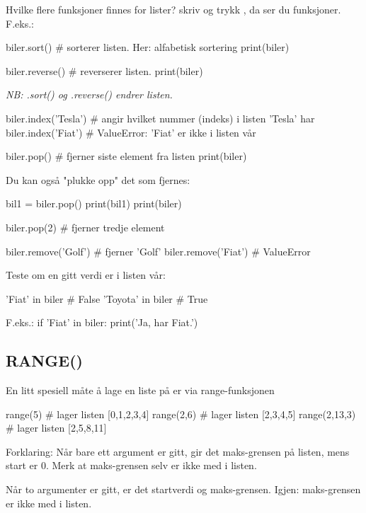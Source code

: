 {Hvilke flere funksjoner finnes for lister? skriv  og trykk , da ser du funksjoner. F.eks.:

\begin{usncodebox}
biler.sort()          # sorterer listen. Her: alfabetisk sortering
print(biler)

biler.reverse()       # reverserer listen. 
print(biler)
\end{usncodebox}

\emph{NB: .sort() og .reverse() endrer listen.}

\begin{usncodebox}
biler.index('Tesla')  # angir hvilket nummer (indeks) i listen 'Tesla' har 
biler.index('Fiat')   # ValueError: 'Fiat' er ikke i listen vår 

biler.pop()           # fjerner siste element fra listen
print(biler)
\end{usncodebox}

Du kan også "plukke opp" det som fjernes:
\begin{usncodebox}
bil1 = biler.pop()
print(bil1)
print(biler)

biler.pop(2)          # fjerner tredje element 

biler.remove('Golf')  # fjerner 'Golf'
biler.remove('Fiat')  # ValueError
\end{usncodebox}

Teste om en gitt verdi er i listen vår:
\begin{usncodebox}
'Fiat' in biler       # False
'Toyota' in biler     # True
\end{usncodebox}

F.eks.:
if 'Fiat' in biler:
   print('Ja, har Fiat.')

\subsection{RANGE()}

En litt spesiell måte å lage en liste på er via range-funksjonen
\begin{usncodebox}
range(5)        # lager listen [0,1,2,3,4]  
range(2,6)      # lager listen [2,3,4,5]
range(2,13,3)   # lager listen [2,5,8,11]
\end{usncodebox}

Forklaring: 
Når bare ett argument er gitt, gir det maks-grensen på listen, mens start er 0. Merk at maks-grensen selv er ikke med i listen.

Når to argumenter er gitt, er det startverdi og maks-grensen. Igjen: maks-grensen er ikke med i listen. 

}
